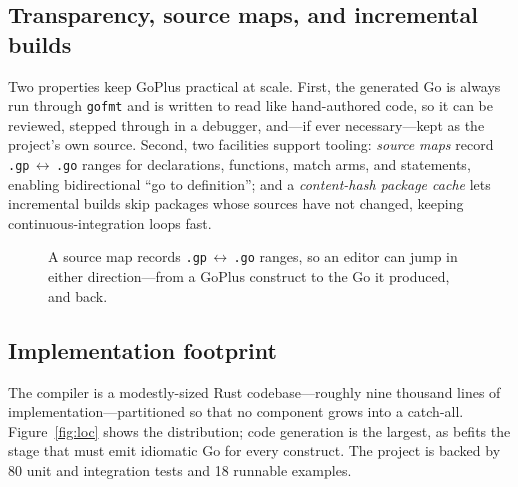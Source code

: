 \documentclass[11pt,a4paper]{article}
\begin{document}
\subsection{Transparency, source maps, and incremental builds}
Two properties keep GoPlus practical at scale. First, the generated Go is always
run through \texttt{gofmt} and is written to read like hand-authored code, so it
can be reviewed, stepped through in a debugger, and---if ever necessary---kept as
the project's own source. Second, two facilities support tooling:
\emph{source maps} record \texttt{.gp}\,\(\leftrightarrow\)\,\texttt{.go} ranges
for declarations, functions, match arms, and statements, enabling bidirectional
``go to definition''; and a \emph{content-hash package cache} lets incremental
builds skip packages whose sources have not changed, keeping continuous-integration
loops fast.

\begin{figure}[ht]
\centering
{}
\caption{A source map records \texttt{.gp}\,$\leftrightarrow$\,\texttt{.go}
ranges, so an editor can jump in either direction---from a GoPlus construct to
the Go it produced, and back.}
\label{fig:srcmap}
\end{figure}

\subsection{Implementation footprint}
The compiler is a modestly-sized Rust codebase---roughly nine thousand lines of
implementation---partitioned so that no component grows into a catch-all.
Figure~\ref{fig:loc} shows the distribution; code generation is the largest, as
befits the stage that must emit idiomatic Go for every construct. The project is
backed by 80 unit and integration tests and 18 runnable examples.
\end{document}
